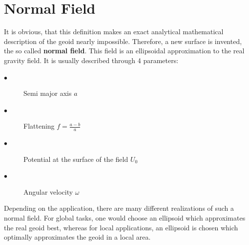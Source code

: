 \documentclass[a4paper,12pt]{report}
\begin{document}
\section{Normal Field}
It is obvious, that this definition makes an exact analytical mathematical description of the geoid nearly impossible. Therefore, a new surface is invented, the so called \textbf{normal field}. This field is an ellipsoidal approximation to the real gravity field. It is usually described through 4 parameters:
\begin{description}
\item[$\bullet$]Semi major axis $a$
\item[$\bullet$]Flattening $f=\frac{a-b}{a}$
\item[$\bullet$]Potential at the surface of the field $U_0$
\item[$\bullet$]Angular velocity $\omega$
\end{description}
Depending on the application, there are many different realizations of such a normal field. For global tasks, one would choose an ellipsoid which approximates the real geoid
best, whereas for local applications, an ellipsoid is chosen which optimally approximates the geoid in a local area.\\
\end{document}
